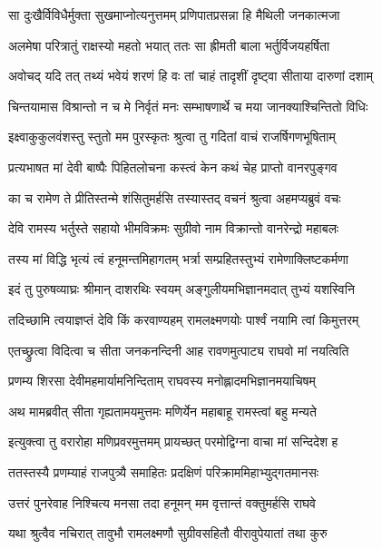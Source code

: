 \twolineshloka
{सा दुःखैर्विविधैर्मुक्ता सुखमाप्नोत्यनुत्तमम्}
{प्रणिपातप्रसन्ना हि मैथिली जनकात्मजा} %

\twolineshloka
{अलमेषा परित्रातुं राक्षस्यो महतो भयात्}
{ततः सा ह्रीमती बाला भर्तुर्विजयहर्षिता} %

\twolineshloka
{अवोचद् यदि तत् तथ्यं भवेयं शरणं हि वः}
{तां चाहं तादृशीं दृष्ट्वा सीताया दारुणां दशाम्} %

\twolineshloka
{चिन्तयामास विश्रान्तो न च मे निर्वृतं मनः}
{सम्भाषणार्थे च मया जानक्याश्चिन्तितो विधिः} %

\twolineshloka
{इक्ष्वाकुकुलवंशस्तु स्तुतो मम पुरस्कृतः}
{श्रुत्वा तु गदितां वाचं राजर्षिगणभूषिताम्} %

\twolineshloka
{प्रत्यभाषत मां देवी बाष्पैः पिहितलोचना}
{कस्त्वं केन कथं चेह प्राप्तो वानरपुङ्गव} %

\twolineshloka
{का च रामेण ते प्रीतिस्तन्मे शंसितुमर्हसि}
{तस्यास्तद् वचनं श्रुत्वा अहमप्यब्रुवं वचः} %

\twolineshloka
{देवि रामस्य भर्तुस्ते सहायो भीमविक्रमः}
{सुग्रीवो नाम विक्रान्तो वानरेन्द्रो महाबलः} %

\twolineshloka
{तस्य मां विद्धि भृत्यं त्वं हनूमन्तमिहागतम्}
{भर्त्रा सम्प्रहितस्तुभ्यं रामेणाक्लिष्टकर्मणा} %

\twolineshloka
{इदं तु पुरुषव्याघ्रः श्रीमान् दाशरथिः स्वयम्}
{अङ्गुलीयमभिज्ञानमदात् तुभ्यं यशस्विनि} %

\twolineshloka
{तदिच्छामि त्वयाज्ञप्तं देवि किं करवाण्यहम्}
{रामलक्ष्मणयोः पार्श्वं नयामि त्वां किमुत्तरम्} %

\twolineshloka
{एतच्छ्रुत्वा विदित्वा च सीता जनकनन्दिनी}
{आह रावणमुत्पाट्य राघवो मां नयत्विति} %

\twolineshloka
{प्रणम्य शिरसा देवीमहमार्यामनिन्दिताम्}
{राघवस्य मनोह्लादमभिज्ञानमयाचिषम्} %

\twolineshloka
{अथ मामब्रवीत् सीता गृह्यतामयमुत्तमः}
{मणिर्येन महाबाहू रामस्त्वां बहु मन्यते} %

\twolineshloka
{इत्युक्त्वा तु वरारोहा मणिप्रवरमुत्तमम्}
{प्रायच्छत् परमोद्विग्ना वाचा मां सन्दिदेश ह} %

\twolineshloka
{ततस्तस्यै प्रणम्याहं राजपुत्र्यै समाहितः}
{प्रदक्षिणं परिक्राममिहाभ्युद्गतमानसः} %

\twolineshloka
{उत्तरं पुनरेवाह निश्चित्य मनसा तदा}
{हनूमन् मम वृत्तान्तं वक्तुमर्हसि राघवे} %

\twolineshloka
{यथा श्रुत्वैव नचिरात् तावुभौ रामलक्ष्मणौ}
{सुग्रीवसहितौ वीरावुपेयातां तथा कुरु} %

